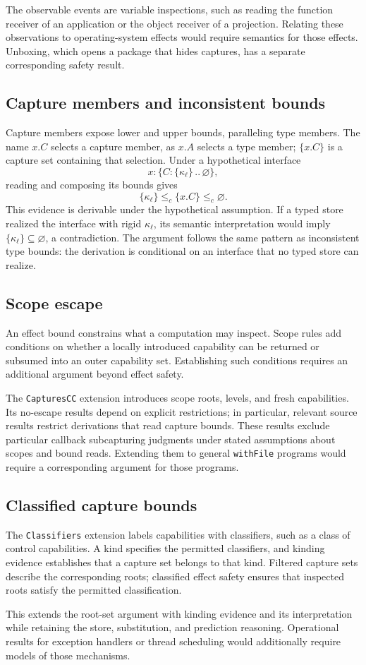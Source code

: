 The observable events are variable inspections, such as reading the
function receiver of an application or the object receiver of a
projection. Relating these observations to operating-system effects
would require semantics for those effects. Unboxing, which opens a
package that hides captures, has a separate corresponding safety result.

\subsection*{Capture members and inconsistent bounds}
Capture members expose lower and upper bounds, paralleling type members.
The name $x.C$ selects a capture member, as $x.A$ selects a type member;
$\{x.C\}$ is a capture set containing that selection.
Under a hypothetical interface
\[
 x:\{C:\{\kappa_{\ell}\}\,..\,\varnothing\},
\]
reading and composing its bounds gives
\[
 \{\kappa_{\ell}\}\le_c\{x.C\}\le_c\varnothing.
\]
This evidence is derivable under the hypothetical assumption. If a
typed store realized the interface with rigid
$\kappa_{\ell}$, its semantic interpretation would imply
$\{\kappa_{\ell}\}\subseteq\varnothing$, a contradiction.
The argument follows the same pattern as inconsistent type bounds:
the derivation is conditional on an interface that no typed store can
realize.

\subsection*{Scope escape}
An effect bound constrains what a computation may inspect. Scope rules
add conditions on whether a locally introduced capability can be returned
or subsumed into an outer capability set. Establishing such conditions
requires an additional argument beyond effect safety.

The \texttt{CapturesCC} extension introduces scope roots, levels, and
fresh capabilities. Its no-escape results depend on explicit restrictions;
in particular, relevant source results restrict derivations that read
capture bounds. These results exclude particular callback subcapturing
judgments under stated assumptions about scopes and bound reads.
Extending them to general \texttt{withFile} programs would require a
corresponding argument for those programs.

\subsection*{Classified capture bounds}
The \texttt{Classifiers} extension labels capabilities with classifiers,
such as a class of control capabilities. A kind specifies the permitted
classifiers, and kinding evidence establishes that a capture set belongs
to that kind. Filtered capture sets describe the corresponding roots;
classified effect safety ensures that inspected roots satisfy the
permitted classification.

This extends the root-set argument with kinding evidence and its
interpretation while retaining the store, substitution, and prediction
reasoning. Operational results for exception handlers or thread
scheduling would additionally require models of those mechanisms.
